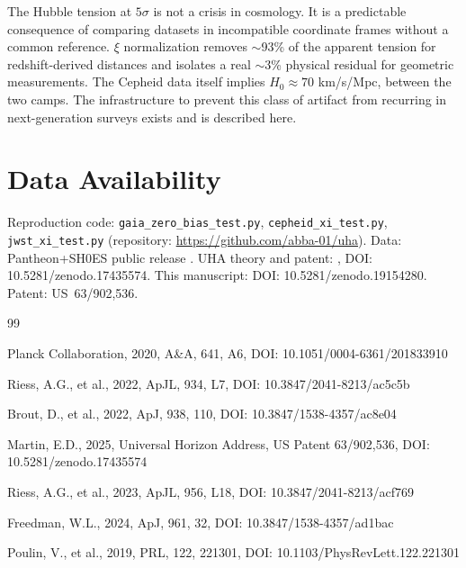\documentclass[12pt,a4paper]{article}
\begin{document}
The Hubble tension at $5\sigma$ is not a crisis in cosmology. It is a
predictable consequence of comparing datasets in incompatible coordinate frames
without a common reference. $\xi$ normalization removes $\sim$93\% of the
apparent tension for redshift-derived distances and isolates a real $\sim$3\%
physical residual for geometric measurements. The Cepheid data itself implies
$H_0 \approx 70$ km/s/Mpc, between the two camps. The infrastructure to
prevent this class of artifact from recurring in next-generation surveys exists
and is described here.

\section*{Data Availability}

Reproduction code: \texttt{gaia\_zero\_bias\_test.py},
\texttt{cepheid\_xi\_test.py}, \texttt{jwst\_xi\_test.py}
(repository: \url{https://github.com/abba-01/uha}).
Data: Pantheon+SH0ES public release \citep{brout2022}.
UHA theory and patent: \citet{martin2025}, DOI: 10.5281/zenodo.17435574.
This manuscript: DOI: 10.5281/zenodo.19154280.
Patent: US~63/902,536.


\begin{thebibliography}{99}

Planck Collaboration, 2020, A\&A, 641, A6,
DOI: 10.1051/0004-6361/201833910

Riess, A.G., et al., 2022, ApJL, 934, L7,
DOI: 10.3847/2041-8213/ac5c5b

Brout, D., et al., 2022, ApJ, 938, 110,
DOI: 10.3847/1538-4357/ac8e04

Martin, E.D., 2025, Universal Horizon Address, US Patent 63/902,536,
DOI: 10.5281/zenodo.17435574

Riess, A.G., et al., 2023, ApJL, 956, L18,
DOI: 10.3847/2041-8213/acf769

Freedman, W.L., 2024, ApJ, 961, 32,
DOI: 10.3847/1538-4357/ad1bac

Poulin, V., et al., 2019, PRL, 122, 221301,
DOI: 10.1103/PhysRevLett.122.221301

\end{thebibliography}
\end{document}
